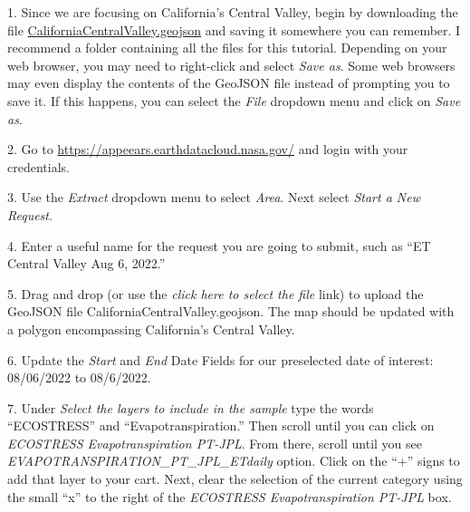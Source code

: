 \documentclass[oneside,a4paper,11pt,explicit]{book}
\begin{document}
1. Since we are focusing on California's Central Valley, begin by downloading the file \href{https://jeremydforsythe.github.io/icecream-tutorials/Tutorial8_Evapotranspiration/CaliforniaCentralValley.geojson}{CaliforniaCentralValley.geojson} and saving it somewhere you can remember. I recommend a folder containing all the files for this tutorial. Depending on your web browser, you may need to right-click and select \textit{Save as}. Some web browsers may even display the contents of the GeoJSON file instead of prompting you to save it. If this happens, you can select the \textit{File} dropdown menu and click on \textit{Save as}. 


2. Go to \href{https://appeears.earthdatacloud.nasa.gov/}{https://appeears.earthdatacloud.nasa.gov/} and login with your credentials. 

3. Use the \textit{Extract} dropdown menu to select \textit{Area}. Next select \textit{Start a New Request}. 

4. Enter a useful name for the request you are going to submit, such as ``ET Central Valley Aug 6, 2022.'' 

5. Drag and drop (or use the \textit{click here to select the file} link) to upload the GeoJSON file CaliforniaCentralValley.geojson. The map should be updated with a polygon encompassing California's Central Valley.

6. Update the \textit{Start} and \textit{End} Date Fields for our preselected date of interest: 08/06/2022 to 08/6/2022.

7. Under \textit{Select the layers to include in the sample} type the words ``ECOSTRESS'' and ``Evapotranspiration.'' Then scroll until you can click on \textit{ECOSTRESS Evapotranspiration PT-JPL}. From there, scroll until you see \textit{EVAPOTRANSPIRATION\_PT\_JPL\_ETdaily} option. Click on the ``+'' signs to add that layer to your cart. Next, clear the selection of the current category using the small ``x'' to the right of the \textit{ECOSTRESS Evapotranspiration PT-JPL} box.
\end{document}
